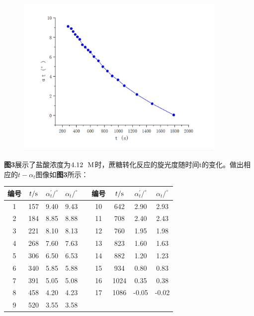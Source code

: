 \documentclass[12pt]{article}
\begin{document}
			\begin{figure}[!h]
				\centering
				\includegraphics[width=0.90\textwidth]{2.png}
			\end{figure}
			\par
			\textbf{图3}展示了盐酸浓度为$4.12\ \ {\rm M}$时，蔗糖转化反应的旋光度随时间t的变化。做出相应的$t-\alpha_{t}$图像如\textbf{图3}所示：\par
			\begin{table}[!h]
				\centering
				\begin{tabular}{ccccccccc}
					\toprule
					编号 & $t/{\rm s}$ & $\alpha^{\prime}_{t}/^{\circ}$ & $\alpha_{t}/^{\circ}$&&编号& $t/{\rm s}$ & $\alpha^{\prime}_{t}/^{\circ}$ & $\alpha_{t}/^{\circ}$\\
					\midrule
					1 & 157 & 9.40 & 9.43 &  & 10 & 642  & 2.90  & 2.93  \\
					2 & 184 & 8.85 & 8.88 &  & 11 & 708  & 2.40  & 2.43  \\
					3 & 221 & 8.10 & 8.13 &  & 12 & 760  & 1.95  & 1.98  \\
					4 & 268 & 7.60 & 7.63 &  & 13 & 823  & 1.60  & 1.63  \\
					5 & 306 & 6.50 & 6.53 &  & 14 & 882  & 1.20  & 1.23  \\
					6 & 340 & 5.85 & 5.88 &  & 15 & 934  & 0.80  & 0.83  \\
					7 & 391 & 5.05 & 5.08 &  & 16 & 1024 & 0.35  & 0.38  \\
					8 & 458 & 4.20 & 4.23 &  & 17 & 1086 & -0.05 & -0.02 \\
					9 & 520 & 3.55 & 3.58 &  &    &      &       &       \\
					\bottomrule
				\end{tabular}
			\end{table}
\end{document}
